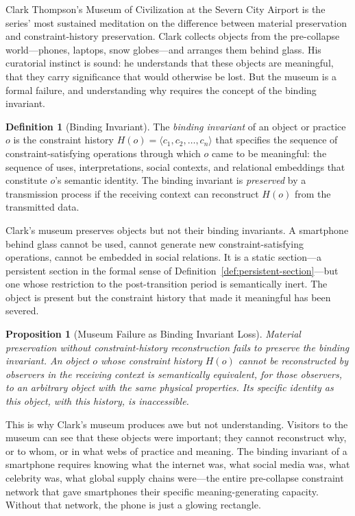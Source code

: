 \documentclass[12pt, oneside]{article}
\theoremstyle{plain}
\newtheorem{proposition}[theorem]{Proposition}
\theoremstyle{definition}
\newtheorem{definition}[theorem]{Definition}
\theoremstyle{remark}
\begin{document}
Clark Thompson's Museum of Civilization at the Severn City Airport
is the series' most sustained meditation on the difference between
material preservation and constraint-history preservation. Clark
collects objects from the pre-collapse world---phones, laptops,
snow globes---and arranges them behind glass. His curatorial
instinct is sound: he understands that these objects are meaningful,
that they carry significance that would otherwise be lost. But the
museum is a formal failure, and understanding why requires the
concept of the binding invariant.

\begin{definition}[Binding Invariant]
The \emph{binding invariant} of an object or practice $o$ is the
constraint history $H(o) = \langle c_1, c_2, \ldots, c_n \rangle$
that specifies the sequence of constraint-satisfying operations
through which $o$ came to be meaningful: the sequence of uses,
interpretations, social contexts, and relational embeddings that
constitute $o$'s semantic identity. The binding invariant is
\emph{preserved} by a transmission process if the receiving context
can reconstruct $H(o)$ from the transmitted data.
\end{definition}

Clark's museum preserves objects but not their binding invariants.
A smartphone behind glass cannot be used, cannot generate new
constraint-satisfying operations, cannot be embedded in social
relations. It is a static section---a persistent section in the
formal sense of Definition~\ref{def:persistent-section}---but one
whose restriction to the post-transition period is semantically
inert. The object is present but the constraint history that made
it meaningful has been severed.

\begin{proposition}[Museum Failure as Binding Invariant Loss]
Material preservation without constraint-history reconstruction
fails to preserve the binding invariant. An object $o$ whose
constraint history $H(o)$ cannot be reconstructed by observers in
the receiving context is semantically equivalent, for those
observers, to an arbitrary object with the same physical
properties. Its specific identity as \emph{this} object, with
\emph{this} history, is inaccessible.
\end{proposition}

This is why Clark's museum produces awe but not understanding.
Visitors to the museum can see that these objects were important;
they cannot reconstruct why, or to whom, or in what webs of
practice and meaning. The binding invariant of a smartphone requires
knowing what the internet was, what social media was, what celebrity
was, what global supply chains were---the entire pre-collapse
constraint network that gave smartphones their specific
meaning-generating capacity. Without that network, the phone is just
a glowing rectangle.
\end{document}
